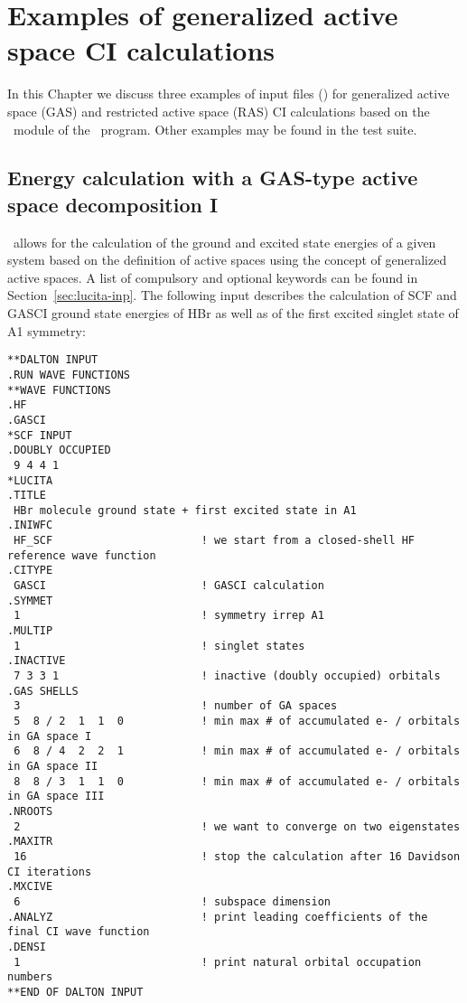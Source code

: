 \chapter{Examples of generalized active space CI calculations}
\label{ch:lucitaexamples}

In this Chapter we discuss three examples of input files (\dalinp) 
for generalized active space (GAS) and restricted active space (RAS) 
CI calculations based on the \lucita\ module of the \dalton\ program. 
Other examples may be found in the test suite. 

\section{Energy calculation with a GAS-type active space decomposition I}\label{cc:lucitaex:gas1}
%
\lucita\  allows for the calculation of the ground and excited state energies
of a given system based on the definition of active spaces using the concept of generalized active spaces. 
A list of compulsory and optional keywords can be found in Section~\ref{sec:lucita-inp}. 
The following input describes the calculation of SCF and GASCI ground state energies of HBr as well as of the 
first excited singlet state of A1 symmetry:

%
\begin{verbatim}
**DALTON INPUT
.RUN WAVE FUNCTIONS
**WAVE FUNCTIONS
.HF
.GASCI
*SCF INPUT
.DOUBLY OCCUPIED
 9 4 4 1
*LUCITA
.TITLE
 HBr molecule ground state + first excited state in A1
.INIWFC
 HF_SCF                       ! we start from a closed-shell HF reference wave function
.CITYPE
 GASCI                        ! GASCI calculation
.SYMMET
 1                            ! symmetry irrep A1
.MULTIP
 1                            ! singlet states
.INACTIVE
 7 3 3 1                      ! inactive (doubly occupied) orbitals
.GAS SHELLS
 3                            ! number of GA spaces
 5  8 / 2  1  1  0            ! min max # of accumulated e- / orbitals in GA space I
 6  8 / 4  2  2  1            ! min max # of accumulated e- / orbitals in GA space II
 8  8 / 3  1  1  0            ! min max # of accumulated e- / orbitals in GA space III
.NROOTS
 2                            ! we want to converge on two eigenstates
.MAXITR
 16                           ! stop the calculation after 16 Davidson CI iterations
.MXCIVE
 6                            ! subspace dimension
.ANALYZ                       ! print leading coefficients of the final CI wave function
.DENSI
 1                            ! print natural orbital occupation numbers
**END OF DALTON INPUT
\end{verbatim}

